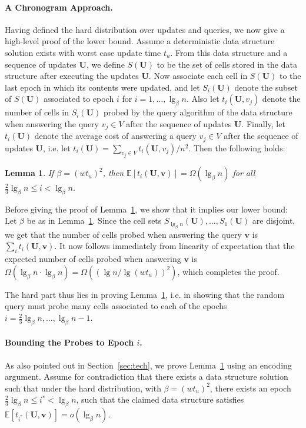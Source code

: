 \documentclass[letterpaper]{article}
\newtheorem{lemma}{Lemma}
\newcommand{\V}{V}
\newcommand{\E}{\mathbb{E}}
\newcommand{\is}{{i^*}}
\newcommand{\U}{\textbf{U}}
\newcommand{\vs}{\textbf{v}}
\begin{document}
\paragraph{A Chronogram Approach.}
Having defined the hard distribution over updates and queries, we now
give a high-level proof of the lower bound. Assume a deterministic
data structure solution exists with worst case update time $t_u$. From
this data structure and a sequence of updates $\U$, we define $S(\U)$
to be the set of cells stored in the data structure after executing
the updates $\U$. Now associate each cell in $S(\U)$ to the last epoch
in which its contents were updated, and let $S_i(\U)$ denote the
subset of $S(\U)$ associated to epoch $i$ for $i=1,\dots,\lg_\beta
n$. Also let $t_i(\U,v_j)$ denote the number of cells in $S_i(\U)$
probed by the query algorithm of the data structure when answering the
query $v_j \in V$ after the sequence of updates $\U$. Finally, let
$t_i(\U)$ denote the average cost of answering a query $v_j \in \V$
after the sequence of updates $\U$, i.e. let $t_i(\U) = \sum_{v_j \in
  V}t_i(\U,v_j)/n^2$. Then the following holds:

\begin{lemma}
\label{lem:exprobes}
If $\beta = (w t_u)^2$, then $\E[t_i(\U,\vs)] = \Omega(\lg_\beta n)$
for all $\tfrac{2}{3} \lg_\beta n \leq i < \lg_\beta n$.
\end{lemma}

Before giving the proof of Lemma~\ref{lem:exprobes}, we show that it
implies our lower bound: Let $\beta$ be as in
Lemma~\ref{lem:exprobes}. Since the cell sets $S_{\lg_\beta
  n}(\U),\dots,S_1(\U)$ are disjoint, we get that the number of cells
probed when answering the query $\vs$ is $\sum_i t_i(\U,\vs)$. It now
follows immediately from linearity of expectation that the expected
number of cells probed when answering $\vs$ is $\Omega(\lg_\beta n
\cdot \lg_\beta n)=\Omega((\lg n/\lg(wt_u))^2)$, which completes the
proof.

The hard part thus lies in proving Lemma~\ref{lem:exprobes}, i.e. in
showing that the random query must probe many cells associated to each
of the epochs $i=\tfrac{2}{3} \lg_\beta n,\dots,\lg_\beta n-1$.

\paragraph{Bounding the Probes to Epoch $i$.}
As also pointed out in Section~\ref{sec:tech}, we prove
Lemma~\ref{lem:exprobes} using an encoding argument. Assume for
contradiction that there exists a data structure solution such that
under the hard distribution, with $\beta=(wt_u)^2$, there exists an
epoch $\tfrac{2}{3} \lg_\beta n \leq \is < \lg_\beta n$, such that the
claimed data structure satisfies $\E[t_\is(\U,\vs)] = o(\lg_\beta n)$.
\end{document}
